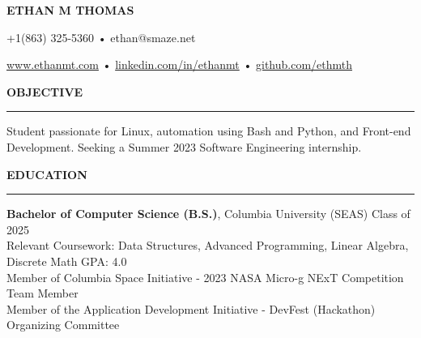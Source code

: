 \documentclass[11pt,letterpaper]{article}
\begin{document}
\begingroup
    \centerline{\MakeUppercase{\LARGE\bf Ethan M Thomas}}
    \medskip
\endgroup

\begingroup
\centerline{+1(863) 325-5360 • ethan@smaze.net}
\endgroup
\par

\begingroup
\centerline{\href{www.ethanmt.com}{www.ethanmt.com} • \href{https://www.linkedin.com/in/ethanmt/}{linkedin.com/in/ethanmt} • \href{https://github.com/ethmth}{github.com/ethmth}}
\endgroup
\par


\medskip
\MakeUppercase{{\bf Objective}} %
\medskip
\hrule %
\begin{list}{}{\setlength{\leftmargin}{0em}}
\item 
    {Student passionate for  %
    Linux, automation using Bash and Python, and Front-end Development. Seeking a Summer 2023 Software Engineering internship.}
\end{list}


\medskip
\MakeUppercase{{\bf Education}} %
\medskip
\hrule %
\begin{list}{}{\setlength{\leftmargin}{0em}}
\item 
{\bf Bachelor of Computer Science (B.S.)}, Columbia University (SEAS) \hfill  {Class of 2025}\\
Relevant Coursework: Data Structures, Advanced Programming, Linear Algebra, Discrete Math \hfill {GPA: 4.0}
\\
Member of Columbia Space Initiative - 2023 NASA Micro-g NExT Competition Team Member \\ 
Member of the Application Development Initiative - DevFest (Hackathon) Organizing Committee
\end{list}
\end{document}
